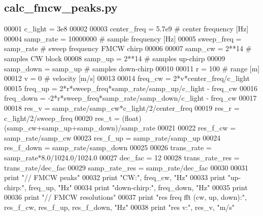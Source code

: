 \subsection{calc\+\_\+fmcw\+\_\+peaks.\+py}
\label{calc__fmcw__peaks_8py_source}

\begin{DoxyCode}
00001 c\_light = 3e8
00002 
00003 center\_freq = 5.7e9 \textcolor{comment}{# center frequency [Hz]}
00004 samp\_rate = 10000000 \textcolor{comment}{# sample frequency [Hz]}
00005 sweep\_freq = samp\_rate \textcolor{comment}{# sweep frequency FMCW chirp}
00006 
00007 samp\_cw = 2**14 \textcolor{comment}{# samples CW block}
00008 samp\_up = 2**14 \textcolor{comment}{# samples up-chirp}
00009 samp\_down = samp\_up \textcolor{comment}{# samples down-chirp}
00010 
00011 r = 100 \textcolor{comment}{# range [m]}
00012 v = 0 \textcolor{comment}{# velocity [m/s]}
00013 
00014 freq\_cw = 2*v*center\_freq/c\_light
00015 freq\_up = 2*r*sweep\_freq*samp\_rate/samp\_up/c\_light - freq\_cw
00016 freq\_down = -2*r*sweep\_freq*samp\_rate/samp\_down/c\_light - freq\_cw
00017 
00018 res\_v = samp\_rate/samp\_cw*c\_light/2/center\_freq
00019 res\_r = c\_light/2/sweep\_freq
00020 res\_t = (float)(samp\_cw+samp\_up+samp\_down)/samp\_rate
00021 
00022 res\_f\_cw = samp\_rate/samp\_cw
00023 res\_f\_up = samp\_rate/samp\_up
00024 res\_f\_down = samp\_rate/samp\_down
00025 
00026 trans\_rate = samp\_rate*8.0/1024.0/1024.0
00027 dec\_fac = 12
00028 trans\_rate\_res = trans\_rate/dec\_fac
00029 samp\_rate\_res = samp\_rate/dec\_fac
00030 
00031 \textcolor{keywordflow}{print} \textcolor{stringliteral}{"// FMCW peaks"}
00032 \textcolor{keywordflow}{print} \textcolor{stringliteral}{"CW:"}, freq\_cw, \textcolor{stringliteral}{"Hz"}
00033 \textcolor{keywordflow}{print} \textcolor{stringliteral}{"up-chirp:"}, freq\_up, \textcolor{stringliteral}{"Hz"}
00034 \textcolor{keywordflow}{print} \textcolor{stringliteral}{"down-chirp:"}, freq\_down, \textcolor{stringliteral}{"Hz"}
00035 \textcolor{keywordflow}{print}
00036 \textcolor{keywordflow}{print} \textcolor{stringliteral}{"// FMCW resolutions"}
00037 \textcolor{keywordflow}{print} \textcolor{stringliteral}{"res freq fft (cw, up, down):"}, res\_f\_cw, res\_f\_up, res\_f\_down, \textcolor{stringliteral}{"Hz"}
00038 \textcolor{keywordflow}{print} \textcolor{stringliteral}{"res v:"}, res\_v, \textcolor{stringliteral}{"m/s"}

\end{DoxyCode}
